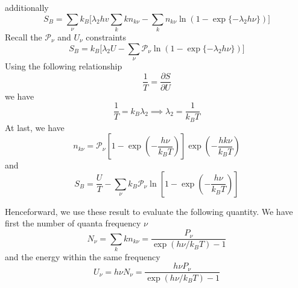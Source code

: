\documentclass[../../../Main.tex]{subfiles}
\begin{document}
additionally
\begin{equation*}
    S_B= \sum_\nu k_B \bigg[\lambda_2hv\sum_{k}kn_{k\nu} - \sum_{k} n_{k\nu}\ln (1-\exp\{-\lambda_2h\nu\})\bigg]
\end{equation*}
Recall the $\mathcal{P}_\nu$ and $U_\nu$ constraints
\begin{equation*}
    S_B= k_B \bigg[\lambda_2U- \sum_\nu\mathcal{P}_\nu \ln (1-\exp\{-\lambda_2h\nu\})\bigg]
\end{equation*}
Using the following relationship
\begin{equation*}
    \frac{1}{T}=\frac{\partial S}{\partial U}
\end{equation*}
we have
\begin{equation*}
    \frac{1}{T}=k_B\lambda_2\implies \lambda_2=\frac{1}{k_BT}
\end{equation*}
At last, we have 
\begin{equation*}
    n_{k\nu}=\mathcal{P}_\nu\left[1-\exp\left(-\frac{h\nu}{k_BT}\right)\right]\exp\left(-\frac{hk\nu}{k_BT}\right)
\end{equation*}
and
\begin{equation*}
    S_B= \frac{U}{T}- \sum_\nu k_B\mathcal{P}_\nu \ln \left[1-\exp\left(-\frac{h\nu}{k_BT}\right)\right]
\end{equation*}

Henceforward, we use these result to evaluate the following quantity. We have first the number of quanta frequency $\nu$
\begin{equation*}
    N_\nu=\sum_k kn_{k\nu}=\frac{P_\nu}{\exp(h\nu/k_BT)-1}
\end{equation*}
and the energy within the same frequency
\begin{equation*}
    U_\nu=h\nu N_\nu =\frac{h\nu P_\nu}{\exp(h\nu/k_BT)-1}
\end{equation*}
\end{document}
